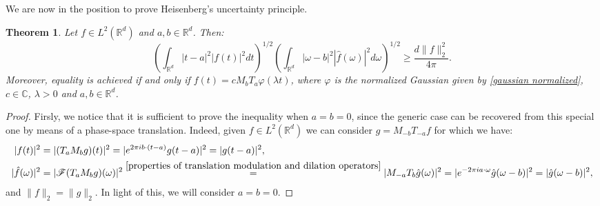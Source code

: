 \documentclass[corpo=11pt, stile=classica, tipotesi=custom,
greek, evenboxes, english]{toptesi}
\numberwithin{equation}{chapter}
\newtheorem{teo}{Theorem}[chapter] %
\theoremstyle{definition}
\theoremstyle{remark}
\newcommand{\R}{\mathbb{R}} %
\newcommand{\F}{\mathscr{F}} %
\newcommand{\C}{\mathbb{C}} %
\begin{document}
We are now in the position to prove Heisenberg's uncertainty principle.
\begin{teo}\label{Heisenberg's uncertainty principle theorem}
	Let $f \in L^2(\R^d)$ and $a,b \in \R^d$. Then:
	\begin{equation}\label{Heisenberg's uncertainty principle formula}
		\left( \int_{\R^d} |t-a|^2 |f(t)|^2dt \right)^{1/2} \left( \int_{\R^d} |\omega - b|^2 |\hat{f}(\omega)|^2 d\omega \right)^{1/2} \geq \dfrac{d\|f\|_2^2}{4\pi}.
	\end{equation}
	Moreover, equality is achieved if and only if $f(t) = c M_b T_a \varphi(\lambda t)$, where $\varphi$ is the normalized Gaussian given by \eqref{gaussian normalized}, $c \in \C$, $\lambda > 0$ and $a,b \in \R^d$.
\end{teo}

\begin{proof}
	Firsly, we notice that it is sufficient to prove the inequality when $a=b=0$, since the generic case can be recovered from this special one by means of a phase-space translation. Indeed, given $f \in L^2(\R^d)$ we can consider $g = M_{-b}T_{-a}f$ for which we have:
	\begin{align*}
		|f(t)|^2 &= |(T_a M_b g)(t)|^2 = |e^{2\pi i b \cdot (t-a)} g(t-a)|^2 = |g(t-a)|^2,\\
		|\hat{f}(\omega)|^2 &= |\F(T_a M_b g)(\omega)|^2 \overset{\ref{properties of translation modulation and dilation operators}}{=} |M_{-a} T_b \hat{g}(\omega)|^2 = |e^{-2\pi i a \cdot \omega} \hat{g}(\omega - b)|^2 = |\hat{g}(\omega-b)|^2,
	\end{align*}
	and $\|f\|_2 = \|g\|_2$. In light of this, we will consider $a=b=0$.
	

\end{proof}
\end{document}
